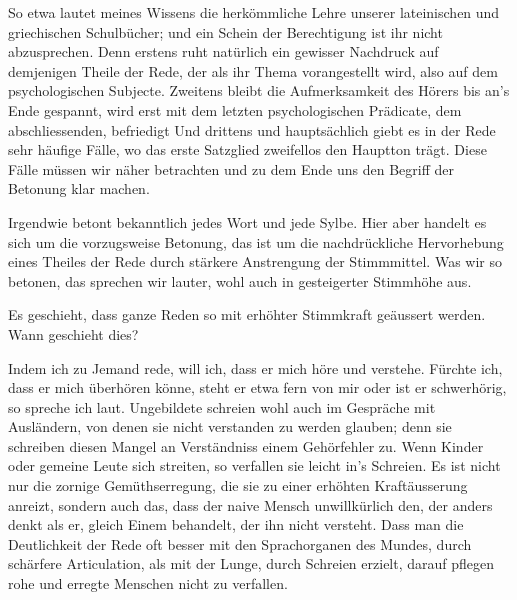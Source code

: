 So etwa lautet meines Wissens die herkömmliche Lehre unserer lateinischen und griechischen Schulbücher; und ein Schein der Berechtigung ist ihr nicht abzusprechen. Denn erstens ruht natürlich ein gewisser Nachdruck auf demjenigen Theile der Rede, der als ihr Thema vorangestellt wird, also auf dem psychologischen Subjecte. Zweitens bleibt die Aufmerksamkeit des Hörers bis an’s Ende gespannt, wird erst mit dem letzten psychologischen Prädicate, dem abschliessenden, befriedigt Und drittens und hauptsächlich giebt es in der Rede sehr häufige Fälle, wo das erste Satzglied zweifellos den Hauptton trägt. Diese Fälle müssen wir näher betrachten und zu dem Ende uns den Begriff der Betonung klar machen. 


\begin{sloppypar}Irgendwie betont  bekanntlich jedes Wort und jede Sylbe. Hier aber handelt es sich um die vorzugsweise Betonung, das ist um die nachdrückliche \label{sp.374} Hervorhebung eines Theiles der Rede durch stärkere Anstrengung der Stimmmittel. Was wir so betonen, das sprechen wir lauter, wohl auch in gesteigerter Stimmhöhe aus.\end{sloppypar}

Es geschieht, dass ganze Reden so mit erhöhter Stimmkraft geäussert werden. Wann geschieht dies?

Indem ich zu Jemand rede, will ich, dass er mich höre und verstehe. Fürchte ich, dass er mich überhören könne, steht er etwa fern \label{fp.358} von mir oder ist er schwerhörig, so spreche ich laut. Ungebildete schreien wohl auch im Gespräche mit Ausländern, von denen sie nicht verstanden zu werden glauben; denn sie schreiben diesen Mangel an Verständniss einem Gehörfehler zu. Wenn Kinder oder gemeine Leute sich streiten, so verfallen sie leicht in’s Schreien. Es ist nicht nur die zornige Gemüthserregung, die sie zu einer erhöhten Kraftäusserung anreizt, sondern auch das, dass der naive Mensch unwillkürlich den, der anders denkt als er, gleich Einem behandelt, der ihn nicht versteht. Dass man die Deutlichkeit der Rede oft besser mit den Sprachorganen des Mundes, durch schärfere Articulation, als mit der Lunge, durch Schreien erzielt, darauf pflegen rohe und erregte Menschen nicht zu verfallen.

